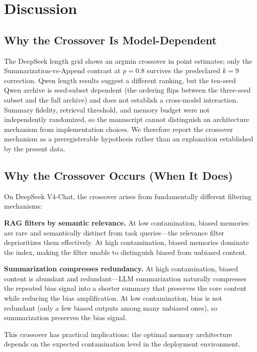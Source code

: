 \documentclass[11pt]{article}
\begin{document}
\section{Discussion}

\subsection{Why the Crossover Is Model-Dependent}

The DeepSeek length grid shows an argmin crossover in point estimates; only the Summarization-vs-Append contrast at $p{=}0.8$ survives the predeclared $k=9$ correction. Qwen length results suggest a different ranking, but the ten-seed Qwen archive is seed-subset dependent (the ordering flips between the three-seed subset and the full archive) and does not establish a cross-model interaction. Summary fidelity, retrieval threshold, and memory budget were not independently randomized, so the manuscript cannot distinguish an architecture mechanism from implementation choices. We therefore report the crossover mechanism as a preregisterable hypothesis rather than an explanation established by the present data.

\subsection{Why the Crossover Occurs (When It Does)}

On DeepSeek V4-Chat, the crossover arises from fundamentally different filtering mechanisms:

\textbf{RAG filters by semantic relevance.} At low contamination, biased memories are rare and semantically distinct from task queries---the relevance filter deprioritizes them effectively. At high contamination, biased memories dominate the index, making the filter unable to distinguish biased from unbiased content.

\textbf{Summarization compresses redundancy.} At high contamination, biased content is abundant and redundant---LLM summarization naturally compresses the repeated bias signal into a shorter summary that preserves the core content while reducing the bias amplification. At low contamination, bias is not redundant (only a few biased outputs among many unbiased ones), so summarization preserves the bias signal.

This crossover has practical implications: the optimal memory architecture depends on the expected contamination level in the deployment environment.
\end{document}
